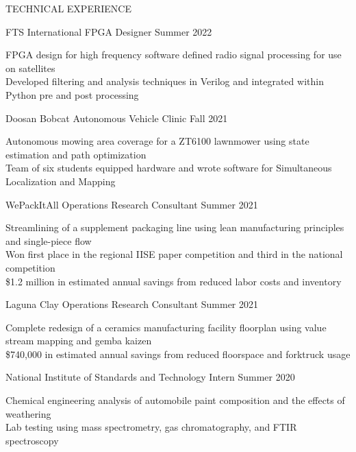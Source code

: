 \documentclass{resume} %
\begin{document}
\begin{rSection}{TECHNICAL EXPERIENCE}

\begin{rSubsection}{FTS International FPGA Designer} {Summer 2022}{}{}
\item FPGA design for high frequency software defined radio signal processing for use on satellites\\
Developed filtering and analysis techniques in Verilog and integrated within Python pre and post processing
\end{rSubsection} 

\begin{rSubsection}{Doosan Bobcat Autonomous Vehicle Clinic} {Fall 2021}{}{}
\item Autonomous mowing area coverage for a ZT6100 lawnmower using state estimation and path optimization \\
Team of six students equipped hardware and wrote software for Simultaneous Localization and Mapping 
\end{rSubsection} 

\begin{rSubsection}{WePackItAll Operations Research Consultant} {Summer 2021}{}{}
\item Streamlining of a supplement packaging line using lean manufacturing principles and single-piece flow \\
Won first place in the regional IISE paper competition and third in the national competition\\
\$1.2 million in estimated annual savings from reduced labor costs and inventory
\end{rSubsection}

\begin{rSubsection}{Laguna Clay Operations Research Consultant} {Summer 2021}{}{}
\item Complete redesign of a ceramics manufacturing facility floorplan using value stream mapping and gemba kaizen  \\
\$740,000 in estimated annual savings from reduced floorspace and forktruck usage
\end{rSubsection}

\begin{rSubsection}{National Institute of Standards and Technology Intern} {Summer 2020}{}{}
\item Chemical engineering analysis of automobile paint composition and the effects of weathering \\
Lab testing using mass spectrometry, gas chromatography, and FTIR spectroscopy
\end{rSubsection}


\end{rSection}
\end{document}
